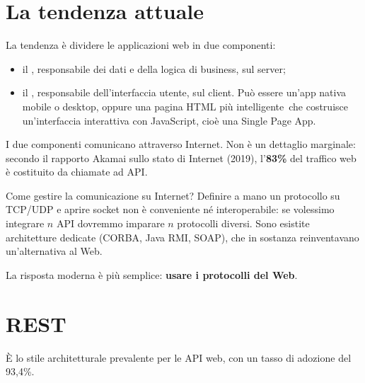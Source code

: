 \section{La tendenza attuale}

La tendenza è dividere le applicazioni web in due componenti:

\begin{itemize}
  \item il , responsabile dei dati e della logica di business, sul
        server;
  \item il , responsabile dell'interfaccia utente, sul client.
        Può essere un'app nativa mobile o desktop, oppure una pagina HTML
        \guillemotleft più intelligente\guillemotright\ che costruisce un'interfaccia interattiva con
        JavaScript, cioè una Single Page App.
\end{itemize}

I due componenti comunicano attraverso Internet. Non è un dettaglio marginale:
secondo il rapporto Akamai sullo stato di Internet (2019), l'\textbf{83\%} del
traffico web è costituito da chiamate ad API.


Come gestire la comunicazione su Internet? Definire a mano un protocollo su
TCP/UDP e aprire socket non è conveniente né interoperabile: se volessimo
integrare $n$ API dovremmo imparare $n$ protocolli diversi. Sono esistite
architetture dedicate (CORBA, Java RMI, SOAP), che in sostanza reinventavano
un'alternativa al Web.

La risposta moderna è più semplice: \textbf{usare i protocolli del Web}.

\section{REST}


È lo stile architetturale prevalente per le API web, con un tasso di adozione
del 93,4\%.

